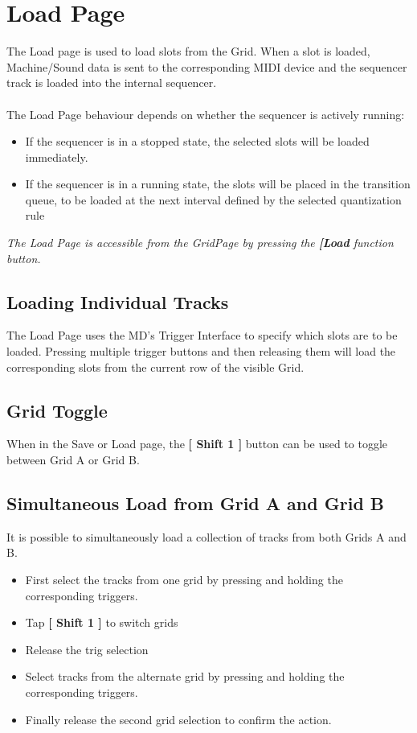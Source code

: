 \chapter{Load Page}
The Load page is used to load slots from the Grid. When a slot is loaded, Machine/Sound data is sent to the corresponding MIDI device and the sequencer track is loaded into the internal sequencer.\\
\\
The Load Page behaviour depends on whether the sequencer is actively running:
\begin{itemize}
    \item If the sequencer is in a stopped state, the selected slots will be loaded immediately.
    \item If the sequencer is in a running state, the slots will be placed in the transition queue, to be loaded at the next interval defined by the selected quantization rule
\end{itemize}
\textit{The Load Page is accessible from the GridPage by pressing the  \textbf{[Load} function button.}

\section{Loading Individual Tracks}
The Load Page uses the MD's Trigger Interface to specify which slots are to be loaded. Pressing multiple trigger buttons and then releasing them will load the corresponding slots from the current row of the visible Grid.
\section{Grid Toggle}
When in the Save or Load page, the \textbf{[ Shift 1 ]} button can be used to toggle between Grid A or Grid B.
\newpage
\section{Simultaneous Load from Grid A and Grid B}
It is possible to simultaneously load a collection of tracks from both Grids A and B. 
\begin{itemize}
\item First select the tracks from one grid by pressing and holding the corresponding triggers.
\item Tap \textbf{[ Shift 1 ]} to switch grids
\item Release the trig selection
\item Select tracks from the alternate grid by pressing and holding the corresponding triggers. 
\item Finally release the second grid selection to confirm the action. 
\end{itemize}

